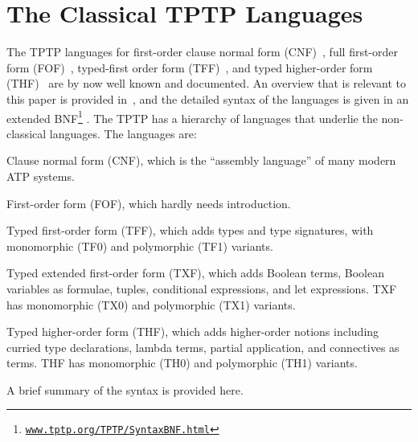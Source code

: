 \documentclass{ceurart}
\newenvironment{packed_itemize}{
\vspace*{-0.3em}
\begin{itemize}
\setlength{\partopsep}{0pt}
\setlength{\itemsep}{1pt}
\setlength{\parskip}{0pt}
\setlength{\parsep}{0pt}
}{\end{itemize}}
\begin{document}
\section{The Classical TPTP Languages}
\label{ClassicalTPTPLanguages}

The TPTP languages for first-order clause normal form (CNF)~\cite{SS98-JAR}, full first-order 
form (FOF)~\cite{Sut09}, typed-first order form (TFF)~\cite{SS+12,BP13-TFF1}, and typed 
higher-order form (THF)~\cite{SB10,KSR16} are by now well known and documented.
An overview that is relevant to this paper is provided in~\cite{SF+22}, and the detailed
syntax of the languages is given in an extended BNF\footnote{%
\label{BNF}\href{https://www.tptp.org/TPTP/SyntaxBNF.html}{\tt www.tptp.org/TPTP/SyntaxBNF.html}} 
\cite{VS06}.
The TPTP has a hierarchy of languages that underlie the non-classical languages. 
The languages are:
\begin{packed_itemize}
\item Clause normal form (CNF), which is the “assembly language” of many modern ATP systems.
\item First-order form (FOF), which hardly needs introduction.
\item Typed first-order form (TFF), which adds types and type signatures, with monomorphic (TF0) 
      and polymorphic (TF1) variants.
\item Typed extended first-order form (TXF), which adds Boolean terms, Boolean variables as 
      formulae, tuples, conditional expressions, and let expressions. 
      TXF has monomorphic (TX0) and polymorphic (TX1) variants.
\item Typed higher-order form (THF), which adds higher-order notions including curried type 
      declarations, lambda terms, partial application, and connectives as terms. 
      THF has monomorphic (TH0) and polymorphic (TH1) variants.
\end{packed_itemize}
A brief summary of the syntax is provided here.
\end{document}
